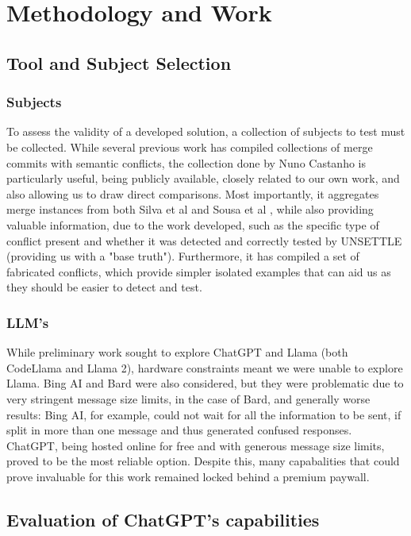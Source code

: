 \chapter{Methodology and Work}\label{chap:chap3}

\section{Tool and Subject Selection}

\subsection{Subjects}

To assess the validity of a developed solution, a collection of subjects to test must be collected. While several previous work has compiled collections of merge commits with semantic conflicts, the collection done by Nuno Castanho \cite{kn:nuno} is particularly useful, being publicly available, closely related to our own work, and also allowing us to draw direct comparisons. Most importantly, it aggregates merge instances from both Silva et al \cite{kn:leuson} and Sousa et al \cite{kn:safemerge}, while also providing valuable information, due to the work developed, such as the specific type of conflict present and whether it was detected and correctly tested by UNSETTLE (providing us with a "base truth"). Furthermore, it has compiled a set of fabricated conflicts, which provide simpler isolated examples that can aid us as they should be easier to detect and test.

\subsection{LLM's}

While preliminary work sought to explore ChatGPT and Llama (both CodeLlama and Llama 2), hardware constraints meant we were unable to explore Llama. Bing AI and Bard were also considered, but they were problematic due to very stringent message size limits, in the case of Bard, and generally worse results: Bing AI, for example, could not wait for all the information to be sent, if split in more than one message and thus generated confused responses. ChatGPT, being hosted online for free and with generous message size limits, proved to be the most reliable option. Despite this, many capabalities that could prove invaluable for this work remained locked behind a premium paywall.

\section{Evaluation of ChatGPT's capabilities}

